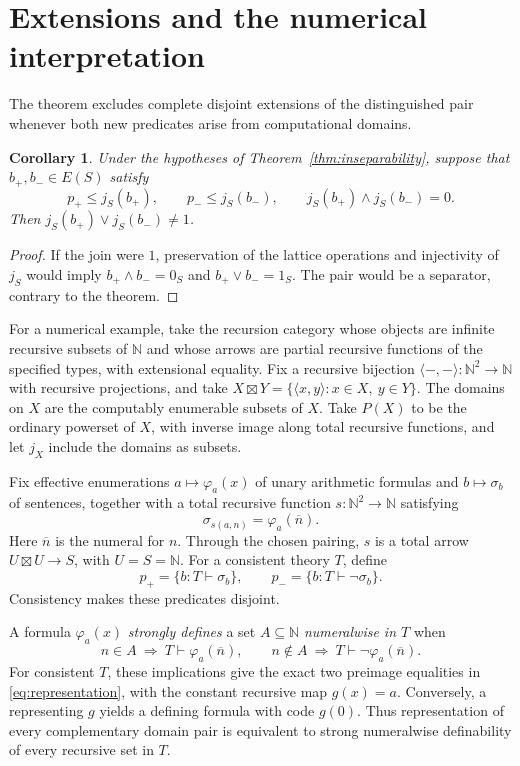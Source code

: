 \documentclass[11pt]{article}
\newtheorem{corollary}[theorem]{Corollary}
\theoremstyle{definition}
\begin{document}
\section{Extensions and the numerical interpretation}

The theorem excludes complete disjoint extensions of the distinguished
pair whenever both new predicates arise from computational domains.
\begin{corollary}\label{cor:extension}
Under the hypotheses of Theorem~\ref{thm:inseparability}, suppose that
$b_+,b_-\in E(S)$ satisfy
\[
 p_+\leq j_S(b_+),\qquad p_-\leq j_S(b_-),\qquad
 j_S(b_+)\wedge j_S(b_-)=0.
\]
Then $j_S(b_+)\vee j_S(b_-)\ne1$.
\end{corollary}
\begin{proof}
If the join were $1$, preservation of the lattice operations and
injectivity of $j_S$ would imply
$b_+\wedge b_-=0_S$ and $b_+\vee b_-=1_S$.
The pair would be a separator, contrary to the theorem.
\end{proof}

For a numerical example, take the recursion category whose objects are
infinite recursive subsets of $\mathbb N$ and whose arrows are partial
recursive functions of the specified types, with extensional equality.
Fix a recursive bijection $\langle-,-\rangle:\mathbb N^2\to\mathbb N$
with recursive projections, and take
$X\boxtimes Y=\{\langle x,y\rangle:x\in X,\ y\in Y\}$.
The domains on $X$ are the computably enumerable subsets of $X$.
Take $P(X)$ to be the ordinary
powerset of $X$, with inverse image along total recursive functions,
and let $j_X$ include the domains as subsets.

Fix effective enumerations $a\mapsto\varphi_a(x)$ of unary arithmetic
formulas and $b\mapsto\sigma_b$ of sentences, together with a total
recursive function $s:\mathbb N^2\to\mathbb N$ satisfying
\[
 \sigma_{s(a,n)}=\varphi_a(\overline n).
\]
Here $\overline n$ is the numeral for $n$. Through the chosen pairing,
$s$ is a total arrow $U\boxtimes U\to S$, with $U=S=\mathbb N$.
For a consistent theory $T$, define
\[
 p_+=\{b:T\vdash\sigma_b\},\qquad
 p_-=\{b:T\vdash\neg\sigma_b\}.
\]
Consistency makes these predicates disjoint.

A formula $\varphi_a(x)$ \emph{strongly defines} a set
$A\subseteq\mathbb N$ \emph{numeralwise in $T$} when
\[
 n\in A\ \Longrightarrow\ T\vdash\varphi_a(\overline n),
 \qquad
 n\notin A\ \Longrightarrow\ T\vdash\neg\varphi_a(\overline n).
\]
For consistent $T$, these implications give the exact two preimage
equalities in \eqref{eq:representation}, with the constant recursive
map $g(x)=a$. Conversely, a representing $g$ yields a defining formula
with code $g(0)$. Thus representation of every complementary domain
pair is equivalent to strong numeralwise definability of every recursive
set in $T$.
\end{document}

